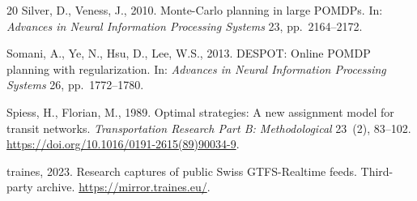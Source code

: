 \begin{thebibliography}{20}
Silver, D., Veness, J., 2010. Monte-Carlo planning in large POMDPs. In:
\emph{Advances in Neural Information Processing Systems} 23, pp.~2164--2172.

Somani, A., Ye, N., Hsu, D., Lee, W.S., 2013. DESPOT: Online POMDP planning with
regularization. In: \emph{Advances in Neural Information Processing Systems}
26, pp.~1772--1780.

Spiess, H., Florian, M., 1989. Optimal strategies: A new assignment model for
transit networks. \emph{Transportation Research Part B: Methodological}
23~(2), 83--102. \url{https://doi.org/10.1016/0191-2615(89)90034-9}.

traines, 2023. Research captures of public Swiss GTFS-Realtime feeds.
Third-party archive. \url{https://mirror.traines.eu/}.

\end{thebibliography}
